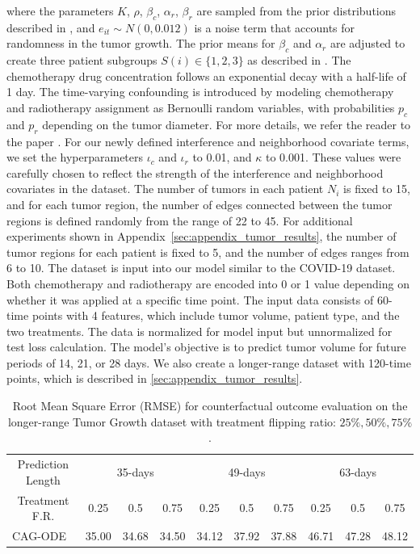 where the parameters \(K\), \(\rho\), \(\beta_c\), \(\alpha_r\), \(\beta_r\) are sampled from the prior distributions described in \cite{geng2017prediction}, and \(e_{it} \sim N(0, 0.012)\) is a noise term that accounts for randomness in the tumor growth. The prior means for \(\beta_c\) and \(\alpha_r\) are adjusted to create three patient subgroups \(S(i) \in \{1, 2, 3\}\) as described in \cite{bica2020crn}. The chemotherapy drug concentration follows an exponential decay with a half-life of 1 day.  The time-varying confounding is introduced by modeling chemotherapy and radiotherapy assignment as Bernoulli random variables, with probabilities \(p_c\) and \(p_r\) depending on the tumor diameter. For more details, we refer the reader to the paper \cite{bica2020crn}. For our newly defined interference and neighborhood covariate terms, we set the hyperparameters \(\iota_c\) and \(\iota_r\) to 0.01, and \(\kappa\) to 0.001. These values were carefully chosen to reflect the strength of the interference and neighborhood covariates in the dataset. The number of tumors in each patient $N_i$ is fixed to 15, and for each tumor region, the number of edges connected between the tumor regions is defined randomly from the range of 22 to 45. For additional experiments shown in Appendix~\ref{sec:appendix_tumor_results}, the number of tumor regions for each patient is fixed to 5, and the number of edges ranges from 6 to 10. The dataset is input into our model similar to the COVID-19 dataset. Both chemotherapy and radiotherapy are encoded into 0 or 1 value depending on whether it was applied at a specific time point. The input data consists of 60-time points with 4 features, which include tumor volume, patient type, and the two treatments. The data is normalized for model input but unnormalized for test loss calculation. The model's objective is to predict tumor volume for future periods of 14, 21, or 28 days. We also create a longer-range dataset with 120-time points, which is described in \ref{sec:appendix_tumor_results}.





\begin{table}[htbp]
  \centering
    \begin{tabular}{l|ccc|ccc|ccc}
    \toprule
    \multicolumn{1}{c|}{Prediction Length} & \multicolumn{3}{c|}{35-days} & \multicolumn{3}{c|}{49-days} & \multicolumn{3}{c}{63-days} \\
    \multicolumn{1}{c|}{Treatment F.R.} & 0.25 & 0.5 & 0.75   & 0.25 & 0.5 & 0.75 & 0.25 & 0.5 & 0.75 \\ \hline
    CAG-ODE & 35.00 & 34.68 & 34.50 & 34.12 & 37.92 & 37.88 & 46.71 & 47.28 & 48.12 \\
    \bottomrule
    \end{tabular}%
    \medskip
    \caption{Root Mean Square Error (RMSE) for counterfactual outcome evaluation on the longer-range Tumor Growth dataset with treatment flipping ratio: $25\%, 50\%, 75\%$.}
  \label{tab:long_range}%
\end{table}%

